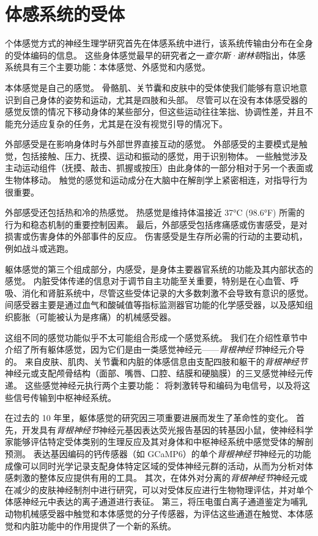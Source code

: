 \chapter{体感系统的受体} \label{chap:chap18}

个体感觉方式的神经生理学研究首先在体感系统中进行，该系统传输由分布在全身的受体编码的信息。
这些身体感觉最早的研究者之一\textit{查尔斯·谢林顿}指出，体感系统具有三个主要功能：本体感觉、外感觉和内感觉。


本体感觉是自己的感觉。
骨骼肌、关节囊和皮肤中的受体使我们能够有意识地意识到自己身体的姿势和运动，尤其是四肢和头部。
尽管可以在没有本体感受器的感觉反馈的情况下移动身体的某些部分，但这些运动往往笨拙、协调性差，并且不能充分适应复杂的任务，尤其是在没有视觉引导的情况下。


外部感受是在影响身体时与外部世界直接互动的感觉。
外部感受的主要模式是触觉，包括接触、压力、抚摸、运动和振动的感觉，用于识别物体。
一些触觉涉及主动运动组件（抚摸、敲击、抓握或按压）由此身体的一部分相对于另一个表面或生物体移动。
触觉的感觉和运动成分在大脑中在解剖学上紧密相连，对指导行为很重要。


外部感受还包括热和冷的热感觉。
热感觉是维持体温接近 37°C (98.6°F) 所需的行为和稳态机制的重要控制因素。
最后，外部感受包括疼痛感或伤害感受，是对损害或伤害身体的外部事件的反应。
伤害感受是生存所必需的行动的主要动机，例如战斗或逃跑。


躯体感觉的第三个组成部分，内感受，是身体主要器官系统的功能及其内部状态的感觉。
内脏受体传递的信息对于调节自主功能至关重要，特别是在心血管、呼吸、消化和肾脏系统中，尽管这些受体记录的大多数刺激不会导致有意识的感觉。
间感受器主要是通过血气和酸碱值等指标监测器官功能的化学感受器，以及感知组织膨胀（可能被认为是疼痛）的机械感受器。


这组不同的感觉功能似乎不太可能组合形成一个感觉系统。
我们在介绍性章节中介绍了所有躯体感觉，因为它们是由一类感觉神经元——\textit{背根神经节}神经元介导的。
来自皮肤、肌肉、关节囊和内脏的体感信息由支配四肢和躯干的\textit{背根神经节}神经元或支配颅骨结构（面部、嘴唇、口腔、结膜和硬脑膜）的三叉感觉神经元传递。
这些感觉神经元执行两个主要功能：
将刺激转导和编码为电信号，以及将这些信号传输到中枢神经系统。


在过去的 10 年里，躯体感觉的研究因三项重要进展而发生了革命性的变化。 
首先，开发具有\textit{背根神经节}神经元基因表达荧光报告基因的转基因小鼠，使神经科学家能够评估特定受体类别的生理反应及其对身体和中枢神经系统中感觉受体的解剖预测。
表达基因编码的钙传感器（如 GCaMP6）的单个\textit{背根神经节}神经元的功能成像可以同时光学记录支配身体特定区域的受体神经元群的活动，从而为分析对体感刺激的整体反应提供有用的工具。
其次，在体外对分离的\textit{背根神经节}神经元或在减少的皮肤神经制剂中进行研究，可以对受体反应进行生物物理评估，并对单个体感神经元中表达的离子通道进行表征。
第三，将压电蛋白离子通道鉴定为哺乳动物机械感受器中触觉和本体感觉的分子传感器，为评估这些通道在触觉、本体感觉和内脏功能中的作用提供了一个新的系统。


